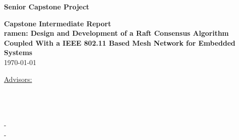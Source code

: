 \begin{titlepage}

 \begin{center}
 \textbf{\large Senior Capstone Project}
       \vspace*{\fill}

        \textbf {Capstone Intermediate Report\\}
        \vspace{10pt}
        \textbf {\large ramen: Design and Development of a Raft Consensus Algorithm \\Coupled With a IEEE 802.11 Based Mesh Network for Embedded Systems\\}
        \vspace{10pt}
        \today
      
        \vfill
            
     \underline {Advisors:}\\
       \advisorOneName\\
       \advisorTwoName\\
       
            
       \vspace{0.8cm}
     
            
       \underline {\group}\\
       \studentOneName - \studentOneEmail\\
       \studentTwoName - \studentTwoEmail\\
      
            
   \end{center}
\end{titlepage}